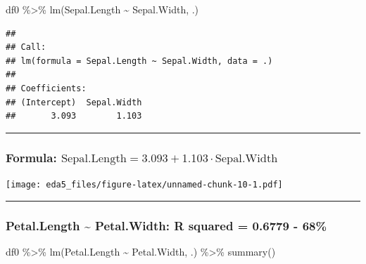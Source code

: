 \documentclass[
]{article}
\newenvironment{Shaded}{\begin{snugshade}}{\end{snugshade}}
\newcommand{\FunctionTok}[1]{\textcolor[rgb]{0.00,0.00,0.00}{#1}}
\newcommand{\NormalTok}[1]{#1}
\newcommand{\SpecialCharTok}[1]{\textcolor[rgb]{0.00,0.00,0.00}{#1}}
\begin{document}
\begin{Shaded}
\begin{Highlighting}[]
\NormalTok{df0 }\SpecialCharTok{\%\textgreater{}\%} \FunctionTok{lm}\NormalTok{(Sepal.Length }\SpecialCharTok{\textasciitilde{}}\NormalTok{ Sepal.Width, .)}
\end{Highlighting}
\end{Shaded}

\begin{verbatim}
## 
## Call:
## lm(formula = Sepal.Length ~ Sepal.Width, data = .)
## 
## Coefficients:
## (Intercept)  Sepal.Width  
##       3.093        1.103
\end{verbatim}

\begin{center}\rule{0.5\linewidth}{0.5pt}\end{center}

\hypertarget{formula-textsepal.length-3.093-1.103cdot-textsepal.width}{%
\subsubsection{\texorpdfstring{Formula:
\(\text{Sepal.Length} = 3.093 + 1.103\cdot \text{Sepal.Width}\)}{Formula: \textbackslash text\{Sepal.Length\} = 3.093 + 1.103\textbackslash cdot \textbackslash text\{Sepal.Width\}}}\label{formula-textsepal.length-3.093-1.103cdot-textsepal.width}}

\texttt{[image: eda5\_files/figure-latex/unnamed-chunk-10-1.pdf]}

\begin{center}\rule{0.5\linewidth}{0.5pt}\end{center}

\hypertarget{petal.length-petal.width-r-squared-0.6779---68}{%
\subsubsection{Petal.Length \textasciitilde{} Petal.Width: R squared =
0.6779 - 68\%}\label{petal.length-petal.width-r-squared-0.6779---68}}

\begin{Shaded}
\begin{Highlighting}[]
\NormalTok{df0 }\SpecialCharTok{\%\textgreater{}\%} \FunctionTok{lm}\NormalTok{(Petal.Length }\SpecialCharTok{\textasciitilde{}}\NormalTok{ Petal.Width, .) }\SpecialCharTok{\%\textgreater{}\%} \FunctionTok{summary}\NormalTok{()}
\end{Highlighting}
\end{Shaded}
\end{document}
